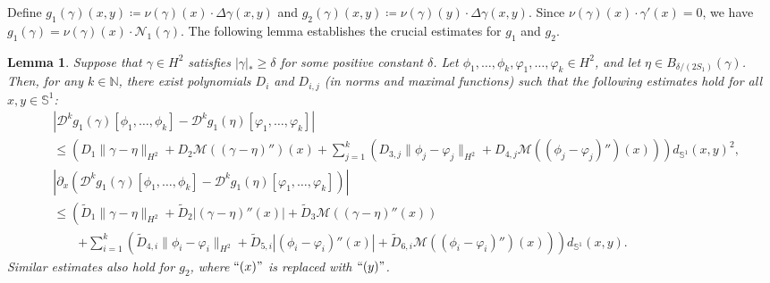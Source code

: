 \documentclass{article}
\newtheorem{lemma}[theorem]{Lemma}
\theoremstyle{remark}
\theoremstyle{definition}
\newcommand{\abs}[1]{\left\lvert #1 \right\rvert}
\numberwithin{equation}{section}
\begin{document}
Define $g_1(\gamma)(x,y) \coloneqq \nu(\gamma)(x) \cdot \Delta\gamma(x,y)$ and $g_2(\gamma)(x,y) \coloneqq \nu(\gamma)(y) \cdot \Delta\gamma(x,y)$.
Since $\nu(\gamma)(x) \cdot \gamma'(x) = 0$, we have $g_1(\gamma) = \nu(\gamma)(x) \cdot \mathcal{N}_1(\gamma)$.
The following lemma establishes the crucial estimates for $g_1$ and $g_2$.

\begin{lemma}
    \label{lem:g1_g2}
    Suppose that $\gamma \in H^2$ satisfies $|\gamma|_\ast \ge \delta$ for some positive constant $\delta$.
    Let $\phi_1,\ldots,\phi_k, \varphi_1,\ldots,\varphi_k \in H^2$, and let $\eta \in B_{\delta/(2S_1)}(\gamma)$.
    Then, for any $k \in \mathbb{N}$, there exist polynomials $D_i$ and $D_{i,j}$ (in norms and maximal functions) such that the following estimates hold for all $x,y \in \mathbb{S}^1${\rm :}
    \begin{align*}
        &|\mathcal{D}^k g_1(\gamma)[\phi_1,\ldots,\phi_k] - \mathcal{D}^k g_1(\eta)[\varphi_1,\ldots,\varphi_k]|\\
        &\le \left(D_1 \|\gamma - \eta\|_{H^2} + D_2 \mathcal{M}((\gamma - \eta)'')(x) + \sum_{j=1}^k \left(D_{3,j} \|\phi_j - \varphi_j\|_{H^2} + D_{4,j} \mathcal{M}((\phi_j - \varphi_j)'')(x)\right) \right)d_{\mathbb{S}^1}(x,y)^2,\\
        &\abs{\partial_x\left(\mathcal{D}^k g_1(\gamma)[\phi_1,\ldots,\phi_k] - \mathcal{D}^k g_1(\eta)[\varphi_1,\ldots,\varphi_k]\right)}\\
        &\le \left(\tilde{D}_1 \|\gamma - \eta\|_{H^2} + \tilde{D}_2 |(\gamma - \eta)''(x)| + \tilde{D}_3 \mathcal{M}((\gamma - \eta)''(x)) \right.\\
        &\qquad \left. + \sum_{i=1}^k \left( \tilde{D}_{4,i} \|\phi_i - \varphi_i\|_{H^2} + \tilde{D}_{5,i} |(\phi_i - \varphi_i)''(x)| + \tilde{D}_{6,i} \mathcal{M}((\phi_i - \varphi_i)'')(x) \right) \right)d_{\mathbb{S}^1}(x,y).
    \end{align*}
    Similar estimates also hold for $g_2$, where $``(x)"$ is replaced with $``(y)"$.
\end{lemma}
\end{document}
